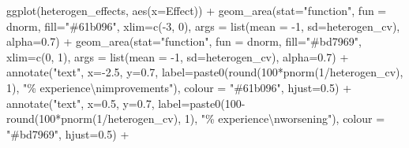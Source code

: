 \documentclass[
]{article}
\newenvironment{Shaded}{\begin{snugshade}}{\end{snugshade}}
\newcommand{\AttributeTok}[1]{\textcolor[rgb]{0.77,0.63,0.00}{#1}}
\newcommand{\DecValTok}[1]{\textcolor[rgb]{0.00,0.00,0.81}{#1}}
\newcommand{\FloatTok}[1]{\textcolor[rgb]{0.00,0.00,0.81}{#1}}
\newcommand{\FunctionTok}[1]{\textcolor[rgb]{0.00,0.00,0.00}{#1}}
\newcommand{\NormalTok}[1]{#1}
\newcommand{\SpecialCharTok}[1]{\textcolor[rgb]{0.00,0.00,0.00}{#1}}
\newcommand{\StringTok}[1]{\textcolor[rgb]{0.31,0.60,0.02}{#1}}
\begin{document}
\begin{Shaded}
\begin{Highlighting}[]
\FunctionTok{ggplot}\NormalTok{(heterogen\_effects, }\FunctionTok{aes}\NormalTok{(}\AttributeTok{x=}\NormalTok{Effect)) }\SpecialCharTok{+}
  \FunctionTok{geom\_area}\NormalTok{(}\AttributeTok{stat=}\StringTok{"function"}\NormalTok{, }\AttributeTok{fun =}\NormalTok{ dnorm, }\AttributeTok{fill=}\StringTok{"\#61b096"}\NormalTok{, }\AttributeTok{xlim=}\FunctionTok{c}\NormalTok{(}\SpecialCharTok{{-}}\DecValTok{3}\NormalTok{, }\DecValTok{0}\NormalTok{),}
            \AttributeTok{args =} \FunctionTok{list}\NormalTok{(}\AttributeTok{mean =} \SpecialCharTok{{-}}\DecValTok{1}\NormalTok{, }\AttributeTok{sd=}\NormalTok{heterogen\_cv), }\AttributeTok{alpha=}\FloatTok{0.7}\NormalTok{) }\SpecialCharTok{+}
  \FunctionTok{geom\_area}\NormalTok{(}\AttributeTok{stat=}\StringTok{"function"}\NormalTok{, }\AttributeTok{fun =}\NormalTok{ dnorm, }\AttributeTok{fill=}\StringTok{"\#bd7969"}\NormalTok{, }\AttributeTok{xlim=}\FunctionTok{c}\NormalTok{(}\DecValTok{0}\NormalTok{, }\DecValTok{1}\NormalTok{),}
            \AttributeTok{args =} \FunctionTok{list}\NormalTok{(}\AttributeTok{mean =} \SpecialCharTok{{-}}\DecValTok{1}\NormalTok{, }\AttributeTok{sd=}\NormalTok{heterogen\_cv), }\AttributeTok{alpha=}\FloatTok{0.7}\NormalTok{) }\SpecialCharTok{+}
  \FunctionTok{annotate}\NormalTok{(}\StringTok{"text"}\NormalTok{, }\AttributeTok{x=}\SpecialCharTok{{-}}\FloatTok{2.5}\NormalTok{, }\AttributeTok{y=}\FloatTok{0.7}\NormalTok{, }
           \AttributeTok{label=}\FunctionTok{paste0}\NormalTok{(}\FunctionTok{round}\NormalTok{(}\DecValTok{100}\SpecialCharTok{*}\FunctionTok{pnorm}\NormalTok{(}\DecValTok{1}\SpecialCharTok{/}\NormalTok{heterogen\_cv), }\DecValTok{1}\NormalTok{), }
                        \StringTok{"\% experience}\SpecialCharTok{\textbackslash{}n}\StringTok{improvements"}\NormalTok{),}
           \AttributeTok{colour =} \StringTok{"\#61b096"}\NormalTok{, }\AttributeTok{hjust=}\FloatTok{0.5}\NormalTok{) }\SpecialCharTok{+}
  \FunctionTok{annotate}\NormalTok{(}\StringTok{"text"}\NormalTok{, }\AttributeTok{x=}\FloatTok{0.5}\NormalTok{, }\AttributeTok{y=}\FloatTok{0.7}\NormalTok{, }
           \AttributeTok{label=}\FunctionTok{paste0}\NormalTok{(}\DecValTok{100}\SpecialCharTok{{-}}\FunctionTok{round}\NormalTok{(}\DecValTok{100}\SpecialCharTok{*}\FunctionTok{pnorm}\NormalTok{(}\DecValTok{1}\SpecialCharTok{/}\NormalTok{heterogen\_cv), }\DecValTok{1}\NormalTok{), }
                        \StringTok{"\% experience}\SpecialCharTok{\textbackslash{}n}\StringTok{worsening"}\NormalTok{),}
           \AttributeTok{colour =} \StringTok{"\#bd7969"}\NormalTok{, }\AttributeTok{hjust=}\FloatTok{0.5}\NormalTok{) }\SpecialCharTok{+}

\end{Highlighting}
\end{Shaded}
\end{document}
